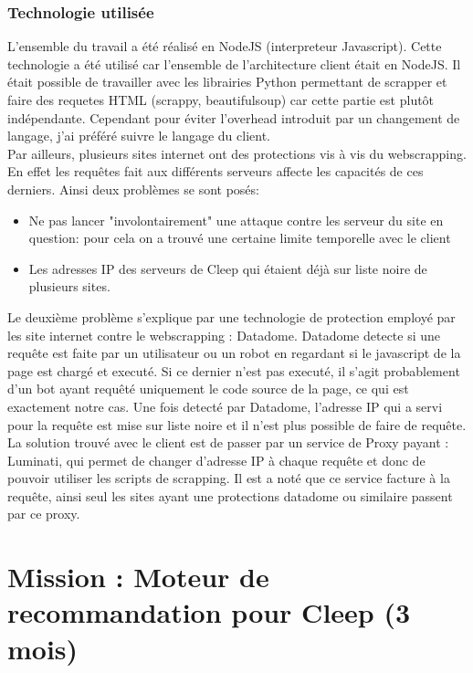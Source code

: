\documentclass{article} %
\begin{document}
\subsubsection{Technologie utilisée\\}
L'ensemble du travail a été réalisé en NodeJS (interpreteur Javascript). Cette technologie a été utilisé car l'ensemble de l'architecture client était en NodeJS. Il était possible de travailler avec les librairies Python permettant de scrapper et faire des requetes HTML (scrappy, beautifulsoup) car cette partie est plutôt indépendante. Cependant pour éviter l'overhead introduit par un changement de langage, j'ai préféré suivre le langage du client.\\
Par ailleurs, plusieurs sites internet ont des protections vis à vis du webscrapping. En effet les requêtes fait aux différents serveurs affecte les capacités de ces derniers. Ainsi deux problèmes se sont posés:
\begin{itemize}
	\itemsep 0em
	\item Ne pas lancer "involontairement" une attaque contre les serveur du site en question: pour cela on a trouvé une certaine limite temporelle avec le client
	\item Les adresses IP des serveurs de Cleep qui étaient déjà sur liste noire de plusieurs sites.
\end{itemize}

Le deuxième problème s'explique par une technologie de protection employé par les site internet contre le webscrapping : Datadome. Datadome detecte si une requête est faite par un utilisateur ou un robot en regardant si le javascript de la page est chargé et executé. Si ce dernier n'est pas executé, il s'agit probablement d'un bot ayant requêté uniquement le code source de la page, ce qui est exactement notre cas. Une fois detecté par Datadome, l'adresse IP qui a servi pour la requête est mise sur liste noire et il n'est plus possible de faire de requête.\\

La solution trouvé avec le client est de passer par un service de Proxy payant : Luminati, qui permet de changer d'adresse IP à chaque requête et donc de pouvoir utiliser les scripts de scrapping. Il est a noté que ce service facture à la requête, ainsi seul les sites ayant une protections datadome ou similaire passent par ce proxy.

\newpage

\section{Mission : Moteur de recommandation pour Cleep (3 mois)}
\end{document}
